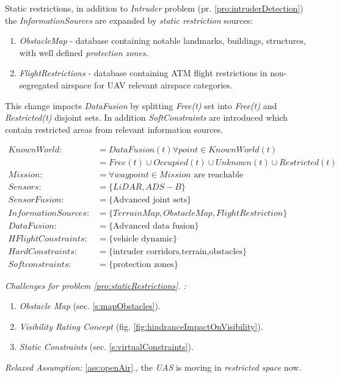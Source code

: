 \begin{problem}{Static restrictions}\label{pro:staticRestrictions},
    in addition to \emph{Intruder} problem (pr. \ref{pro:intruderDetection}) the \emph{InformationSources} are expanded by \emph{static restriction} sources: 
    \begin{enumerate}
        \item \emph{ObstacleMap} - database containing notable landmarks, buildings, structures, with well defined \emph{protection zones}.
        \item \emph{FlightRestrictions} - database containing ATM flight restrictions in non-segregated airspace for UAV relevant airspace categories. 
    \end{enumerate}
    \noindent This change impacts \emph{DataFusion} by splitting \emph{Free(t)} set into \emph{Free(t)} and \emph{Restricted(t)} disjoint sets. In addition \emph{SoftConstraints} are introduced which contain restricted areas from relevant information sources.  
    
    \begin{equation}\label{eq:staticRestrictionsProblemDefinition}
        \begin{aligned}
            KnownWorld:&= DataFusion(t)\forall point\in KnownWorld(t)\\
                       &=Free(t) \cup Occupied(t) \cup Unknown(t)\cup Restricted(t)\\
            Mission:&= \forall waypoint\in Mission \text{ are reachable}\\
            Sensors:&= \{LiDAR,ADS-B\}\\
            SensorFusion:&= \{\text{Advanced joint sets}\}\\
            InformationSources:&=\{Terrain Map,Obstacle Map,Flight Restriction\}\\
            DataFusion:&= \{\text{Advanced data fusion}\}\\
            HFlightConstraints:&=\{\text{vehicle dynamic}\}\\
            HardConstraints:&=\{\text{intruder corridors,terrain,obstacles}\}\\
            Softconstraints:&=\{\text{protection zones}\}
        \end{aligned}
    \end{equation}
    

    \noindent \emph{Challenges for problem  \ref{pro:staticRestrictions}. :}
    \begin{enumerate}
        \item \emph{Obstacle Map} (sec. \ref{s:mapObstacles}).
        \item \emph{Visibility Rating Concept} (fig. \ref{fig:hindranceImpactOnVisibility}).
        \item \emph{Static Constraints} (sec. \ref{s:virtualConstraints}).
    \end{enumerate}

    \noindent \emph{Relaxed Assumption: } \ref{ass:openAir}., the \emph{UAS} is moving in \emph{restricted space} now.
\end{problem}

